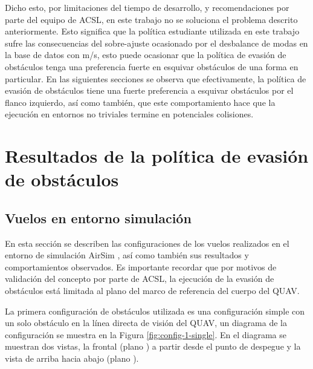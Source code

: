 Dicho esto, por limitaciones del tiempo de desarrollo, y recomendaciones por parte del equipo de ACSL, en este trabajo no se soluciona el problema descrito anteriormente. Esto significa que la política estudiante utilizada en este trabajo sufre las consecuencias del sobre-ajuste ocasionado por el desbalance de modas en la base de datos con  m/s, esto puede ocasionar que la política de evasión de obstáculos tenga una preferencia fuerte en esquivar obstáculos de una forma en particular. En las siguientes secciones se observa que efectivamente, la política de evasión de obstáculos tiene una fuerte preferencia a esquivar obstáculos por el flanco izquierdo, así como también, que este comportamiento hace que la ejecución en entornos no triviales termine en potenciales colisiones.

\section{Resultados de la política de evasión de obstáculos}

\label{sec:results-flights}

\subsection{Vuelos en entorno simulación}

\label{sec:results-AirSim}

En esta sección se describen las configuraciones de los vuelos realizados en el entorno de simulación AirSim \cite{shah2018airsim}, así como también sus resultados y comportamientos observados. Es importante recordar que por motivos de validación del concepto por parte de ACSL, la ejecución de la evasión de obstáculos está limitada al plano  del marco de referencia del cuerpo del QUAV.

La primera configuración de obstáculos utilizada es una configuración simple con un solo obstáculo en la línea directa de visión del QUAV, un diagrama de la configuración se muestra en la Figura \ref{fig:config-1-single}. En el diagrama se muestran dos vistas, la frontal (plano ) a partir desde el punto de despegue y la vista de arriba hacia abajo (plano ).

